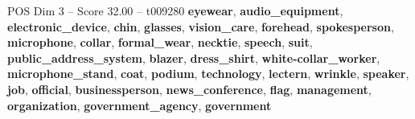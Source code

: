 \begin{textsample}{POS Dim 3 – Score 32.00 – t009280}  \label{ex:f3_pos_005}
\textbf{eyewear}, \textbf{audio\_equipment}, \textbf{electronic\_device}, \textbf{chin}, \textbf{glasses}, \textbf{vision\_care}, \textbf{forehead}, \textbf{spokesperson}, \textbf{microphone}, \textbf{collar}, \textbf{formal\_wear}, \textbf{necktie}, \textbf{speech}, \textbf{suit}, \textbf{public\_address\_system}, \textbf{blazer}, \textbf{dress\_shirt}, \textbf{white-collar\_worker}, \textbf{microphone\_stand}, \textbf{coat}, \textbf{podium}, \textbf{technology}, \textbf{lectern}, \textbf{wrinkle}, \textbf{speaker}, \textbf{job}, \textbf{official}, \textbf{businessperson}, \textbf{news\_conference}, \textbf{flag}, \textbf{management}, \textbf{organization}, \textbf{government\_agency}, \textbf{government}

\end{textsample}
